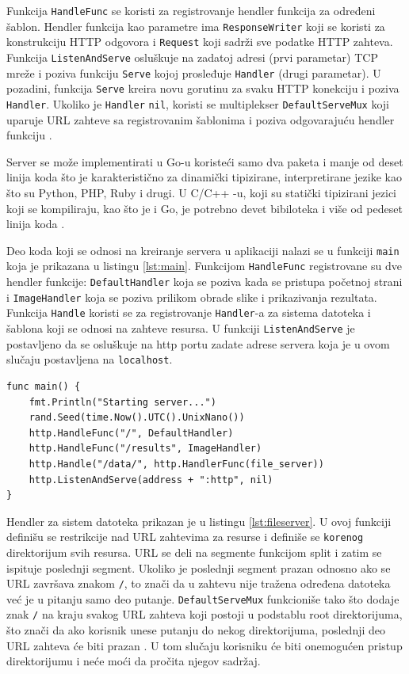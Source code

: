 \documentclass[12pt,oneside]{memoir}
\begin{document}
Funkcija \texttt{HandleFunc} se koristi za registrovanje hendler funkcija za određeni šablon. Hendler funkcija  kao parametre ima \texttt{ResponseWriter} koji se koristi za konstrukciju HTTP odgovora i \texttt{Request} koji sadrži sve podatke HTTP zahteva. Funkcija \texttt{ListenAndServe} osluškuje na zadatoj adresi (prvi parametar) TCP mreže i poziva funkciju \texttt{Serve} kojoj prosleđuje \texttt{Handler} (drugi parametar). U pozadini, funkcija \texttt{Serve} kreira novu gorutinu za svaku HTTP konekciju i poziva \texttt{Handler}. Ukoliko je \texttt{Handler} \texttt{nil}, koristi se multiplekser \texttt{DefaultServeMux} koji uparuje URL zahteve sa registrovanim šablonima i poziva odgovarajuću hendler funkciju \cite{http}.

Server se može implementirati u Go-u  koristeći samo dva paketa i manje od deset linija koda što je karakteristično za dinamički tipizirane, interpretirane jezike kao što su Python, PHP, Ruby i drugi. U C/C++ -u, koji su statički tipizirani jezici koji se kompiliraju, kao što je i Go, je potrebno devet bibiloteka i više od pedeset linija koda \cite{server}.

Deo koda koji se odnosi na kreiranje servera u aplikaciji nalazi se u funkciji \texttt{main} koja je prikazana u listingu \ref{lst:main}. Funkcijom \texttt{HandleFunc} registrovane su dve hendler funkcije: \texttt{DefaultHandler} koja se poziva kada se pristupa početnoj strani i \texttt{ImageHandler} koja se poziva prilikom obrade slike i prikazivanja rezultata. Funkcija \texttt{Handle} koristi se za registrovanje \texttt{Handler}-a za sistema datoteka i šablona koji se odnosi na zahteve resursa.  U funkciji \texttt{ListenAndServe} je postavljeno da se osluškuje na http portu zadate adrese servera koja je u ovom slučaju postavljena na \texttt{localhost}.

\begin{center}
\begin{lstlisting}[caption={Funkcija \texttt{main}, kreiranje servera},label={lst:main},  backgroundcolor=\color{background} ]
func main() {
	fmt.Println("Starting server...")
	rand.Seed(time.Now().UTC().UnixNano())
	http.HandleFunc("/", DefaultHandler)
	http.HandleFunc("/results", ImageHandler)
	http.Handle("/data/", http.HandlerFunc(file_server))
	http.ListenAndServe(address + ":http", nil)
}
\end{lstlisting}
\end{center}

\label{fileserver}Hendler za sistem datoteka prikazan je u listingu \ref{lst:fileserver}. U ovoj funkciji definišu se restrikcije nad URL zahtevima za resurse i definiše se \texttt{korenog} direktorijum svih resursa. URL se deli na segmente funkcijom split i zatim se ispituje poslednji segment. Ukoliko je poslednji segment prazan odnosno ako se URL završava znakom \texttt{/}, to znači da u zahtevu nije tražena određena datoteka već je u pitanju samo deo putanje. \texttt{DefaultServeMux} funkcioniše tako što dodaje znak \texttt{/} na kraju svakog URL zahteva koji postoji u podstablu root direktorijuma, što znači da ako korisnik unese putanju do nekog direktorijuma, poslednji deo URL zahteva će biti prazan \cite{http}. U tom slučaju korisniku će biti onemogućen pristup direktorijumu i neće moći da pročita njegov sadržaj.
\end{document}
